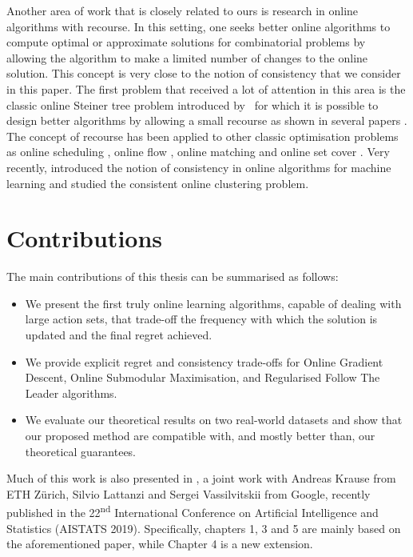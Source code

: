 Another area of work that is closely related to ours is research in online algorithms with recourse. In this setting, one seeks better online algorithms to compute optimal or approximate solutions for combinatorial problems by allowing the algorithm to make a limited number of changes to the online solution. 
This concept is very close to the notion of consistency that we consider in this paper. The first problem that received a lot of attention in this area is the classic online Steiner tree problem introduced by~\cite{DBLP:journals/siamdm/ImaseW91} for which it is possible to design better algorithms by allowing a small recourse as shown in several papers \citep{DBLP:journals/siamcomp/GuG016, DBLP:conf/soda/GuptaK14, DBLP:conf/stoc/LackiOPSZ15, DBLP:journals/siamcomp/MegowSVW16}. The concept of recourse has been applied to other classic optimisation problems as online scheduling \citep{DBLP:journals/algorithmica/AndrewsGZ99, DBLP:journals/algorithmica/EpsteinL14, DBLP:journals/algorithmica/PhillipsW98, DBLP:journals/mor/SandersSS09, DBLP:conf/esa/SkutellaV10}, online flow \citep{DBLP:conf/soda/GuptaKS14, DBLP:journals/jal/Westbrook00}, online matching \cite{DBLP:conf/soda/BernsteinHR18} and online set cover \citep{DBLP:conf/stoc/GuptaK0P17}. Very recently, \cite{DBLP:conf/icml/LattanziV17} introduced the notion of consistency in online algorithms for machine learning and studied the consistent online clustering problem.

\section{Contributions}
The main contributions of this thesis can be summarised as follows:
\begin{itemize}
    \item We present the first truly online learning algorithms, capable of dealing with large action sets, that trade-off the frequency with which the solution is updated and the final regret achieved.
    \item We provide explicit regret and consistency trade-offs for Online Gradient Descent, Online Submodular Maximisation, and Regularised Follow The Leader algorithms.
    \item We evaluate our theoretical results on two real-world datasets and show that our proposed method are compatible with, and mostly better than, our theoretical guarantees.
\end{itemize}

Much of this work is also presented in \citet{karimi2019}, a joint work with Andreas Krause from ETH Z\"urich, Silvio Lattanzi and Sergei Vassilvitskii from Google, recently published in the 22\textsuperscript{nd} International Conference on Artificial Intelligence and Statistics (AISTATS 2019). Specifically, chapters 1, 3 and 5 are mainly based on the aforementioned paper, while Chapter 4 is a new extension.

